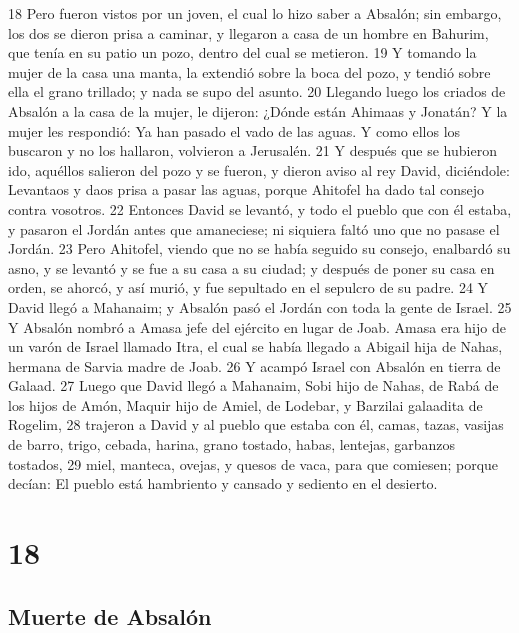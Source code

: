 18 Pero fueron vistos por un joven, el cual lo hizo saber a Absalón; sin embargo, los dos se dieron prisa a caminar, y llegaron a casa de un hombre en Bahurim, que tenía en su patio un pozo, dentro del cual se metieron.
19 Y tomando la mujer de la casa una manta, la extendió sobre la boca del pozo, y tendió sobre ella el grano trillado; y nada se supo del asunto.
20 Llegando luego los criados de Absalón a la casa de la mujer, le dijeron: ¿Dónde están Ahimaas y Jonatán? Y la mujer les respondió: Ya han pasado el vado de las aguas. Y como ellos los buscaron y no los hallaron, volvieron a Jerusalén.
21 Y después que se hubieron ido, aquéllos salieron del pozo y se fueron, y dieron aviso al rey David, diciéndole: Levantaos y daos prisa a pasar las aguas, porque Ahitofel ha dado tal consejo contra vosotros.
22 Entonces David se levantó, y todo el pueblo que con él estaba, y pasaron el Jordán antes que amaneciese; ni siquiera faltó uno que no pasase el Jordán.
23 Pero Ahitofel, viendo que no se había seguido su consejo, enalbardó su asno, y se levantó y se fue a su casa a su ciudad; y después de poner su casa en orden, se ahorcó, y así murió, y fue sepultado en el sepulcro de su padre. 
24 Y David llegó a Mahanaim; y Absalón pasó el Jordán con toda la gente de Israel.
25 Y Absalón nombró a Amasa jefe del ejército en lugar de Joab. Amasa era hijo de un varón de Israel llamado Itra, el cual se había llegado a Abigail hija de Nahas, hermana de Sarvia madre de Joab.
26 Y acampó Israel con Absalón en tierra de Galaad.
27 Luego que David llegó a Mahanaim, Sobi hijo de Nahas, de Rabá de los hijos de Amón, Maquir hijo de Amiel, de Lodebar, y Barzilai galaadita de Rogelim,
28 trajeron a David y al pueblo que estaba con él, camas, tazas, vasijas de barro, trigo, cebada, harina, grano tostado, habas, lentejas, garbanzos tostados,
29 miel, manteca, ovejas, y quesos de vaca, para que comiesen; porque decían: El pueblo está hambriento y cansado y sediento en el desierto.

\chapter{18}

\section*{Muerte de Absalón}


